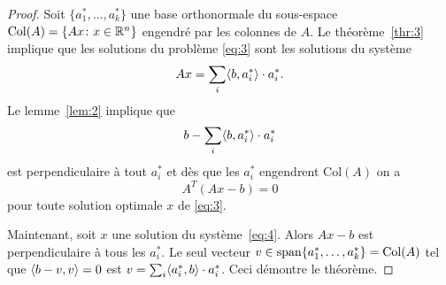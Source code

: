 \begin{proof}
  Soit $\{a^*_1,\dots,a^*_k\}$ une base orthonormale du sous-espace $\mathrm{Col}(A)=\{Ax \colon x \in \mathbb{R}^n\}$ engendré par les colonnes de $A$. Le théorème~\ref{thr:3} implique que  les solutions du problème \eqref{eq:3} sont les solutions du système 
  \begin{displaymath}
    A x = \sum_i \langle {b,a^*_i} \rangle \cdot a^*_i. 
  \end{displaymath}
Le lemme~\ref{lem:2} implique que 
\begin{displaymath}
  b - \sum_i \langle {b,a^*_i} \rangle \cdot a^*_i
\end{displaymath}
est perpendiculaire à tout $a_i^*$ et dès que les $a^*_i$ engendrent 
$\mathrm{Col}(A)$ 
on a 
\begin{displaymath}
  A^T (Ax - b) = 0
\end{displaymath}
pour toute solution optimale $x$ de \eqref{eq:3}. 


Maintenant, soit $x$ une solution du système~\eqref{eq:4}. 
Alors $ A x -b$ est 
perpendiculaire à tous les $a_i^*$. Le seul vecteur $v \in \operatorname{span}\{a_1^*,\dots,a_k^*\} = \mathrm{Col}(A)$ tel que $\langle {b-v,v} \rangle=0$  est $v = \sum_i\langle {a_i^*,b} \rangle \cdot a_i^*$. Ceci démontre le théorème.  
\end{proof}




